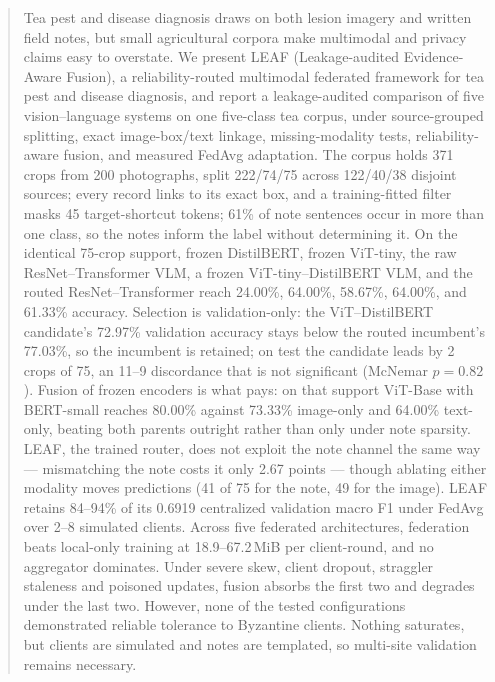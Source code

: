 \documentclass[conference]{IEEEtran}
\begin{document}
\begin{abstract}
Tea pest and disease diagnosis draws on both lesion imagery and written field
notes, but small agricultural corpora make multimodal and privacy claims easy
to overstate. We present LEAF (Leakage-audited Evidence-Aware Fusion), a
reliability-routed multimodal federated framework for tea pest and disease diagnosis, and
report a leakage-audited comparison of five vision--language systems on one
five-class tea corpus, under source-grouped splitting, exact image-box/text
linkage, missing-modality tests, reliability-aware fusion, and measured FedAvg
adaptation. The corpus holds 371 crops from 200 photographs, split 222/74/75
across 122/40/38 disjoint sources; every record links to its exact box, and a
training-fitted filter masks 45 target-shortcut tokens; 61\% of note sentences
occur in more than one class, so the notes inform the label without
determining it. On the identical
75-crop support, frozen DistilBERT, frozen ViT-tiny, the raw
ResNet--Transformer VLM, a frozen ViT-tiny--DistilBERT VLM, and the routed
ResNet--Transformer reach 24.00\%, 64.00\%, 58.67\%, 64.00\%, and 61.33\% accuracy.
Selection is validation-only: the ViT--DistilBERT candidate's 72.97\% validation
accuracy stays below the routed incumbent's 77.03\%, so the incumbent is
retained; on test the candidate leads by 2 crops of 75, an 11--9 discordance that is not
significant (McNemar $p=0.82$). Fusion of frozen encoders is what pays: on that
support ViT-Base with BERT-small reaches 80.00\% against 73.33\% image-only and
64.00\% text-only, beating both parents outright rather than only under
note sparsity. LEAF, the trained router, does not exploit the note channel
the same way ---
mismatching the note costs it only 2.67 points --- though ablating either modality moves
predictions (41 of 75 for the note, 49 for the image). LEAF retains
84--94\% of its 0.6919 centralized validation macro F1 under FedAvg over
2--8 simulated clients. Across five federated architectures, federation beats
local-only training at 18.9--67.2\,MiB per client-round, and no aggregator
dominates. Under severe skew, client dropout, straggler staleness and poisoned
updates, fusion absorbs the first two and degrades under the last two. However,
none of the tested configurations demonstrated reliable tolerance to Byzantine
clients. Nothing saturates, but clients are simulated and notes are templated,
so multi-site validation remains necessary.
\end{abstract}
\end{document}
